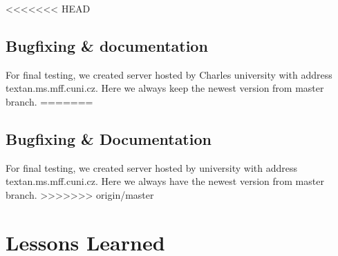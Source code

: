 <<<<<<< HEAD
\subsection{Bugfixing \& documentation}
For final testing, we created server hosted by Charles university with address textan.ms.mff.cuni.cz.
Here we always keep the newest version from master branch.
=======
\subsection{Bugfixing \& Documentation}
For final testing, we created server hosted by university with address textan.ms.mff.cuni.cz.
Here we always have the newest version from master branch.
>>>>>>> origin/master

\section{Lessons Learned}
